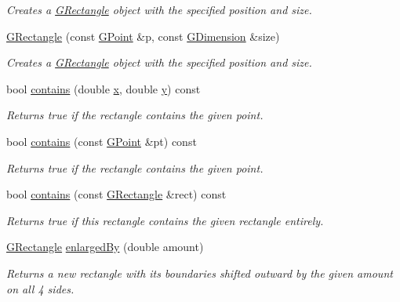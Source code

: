 \begin{DoxyCompactItemize}
\begin{DoxyCompactList}\small\item\em Creates a {\ttfamily \mbox{\hyperlink{structsgl_1_1GRectangle}{G\+Rectangle}}} object with the specified position and size. \end{DoxyCompactList}\item 
\mbox{\hyperlink{structsgl_1_1GRectangle_a90356cb96943b1a130aa934f150265a7}{G\+Rectangle}} (const \mbox{\hyperlink{structsgl_1_1GPoint}{G\+Point}} \&p, const \mbox{\hyperlink{structsgl_1_1GDimension}{G\+Dimension}} \&size)
\begin{DoxyCompactList}\small\item\em Creates a {\ttfamily \mbox{\hyperlink{structsgl_1_1GRectangle}{G\+Rectangle}}} object with the specified position and size. \end{DoxyCompactList}\item 
bool \mbox{\hyperlink{structsgl_1_1GRectangle_abb6a5d7c03e6eaaae97264c4799ce7c3}{contains}} (double \mbox{\hyperlink{structsgl_1_1GRectangle_af88b946fb90d5f08b5fb740c70e98c10}{x}}, double \mbox{\hyperlink{structsgl_1_1GRectangle_ab927965981178aa1fba979a37168db2a}{y}}) const
\begin{DoxyCompactList}\small\item\em Returns {\ttfamily true} if the rectangle contains the given point. \end{DoxyCompactList}\item 
bool \mbox{\hyperlink{structsgl_1_1GRectangle_a1dbc9dafaae51958112dbe1267a1f547}{contains}} (const \mbox{\hyperlink{structsgl_1_1GPoint}{G\+Point}} \&pt) const
\begin{DoxyCompactList}\small\item\em Returns {\ttfamily true} if the rectangle contains the given point. \end{DoxyCompactList}\item 
bool \mbox{\hyperlink{structsgl_1_1GRectangle_a5e2ef5fc6df7e73cd949c042ba2ffcf7}{contains}} (const \mbox{\hyperlink{structsgl_1_1GRectangle}{G\+Rectangle}} \&rect) const
\begin{DoxyCompactList}\small\item\em Returns {\ttfamily true} if this rectangle contains the given rectangle entirely. \end{DoxyCompactList}\item 
\mbox{\hyperlink{structsgl_1_1GRectangle}{G\+Rectangle}} \mbox{\hyperlink{structsgl_1_1GRectangle_adddb08ead701a5144949ca673a44292c}{enlarged\+By}} (double amount)
\begin{DoxyCompactList}\small\item\em Returns a new rectangle with its boundaries shifted outward by the given amount on all 4 sides. \end{DoxyCompactList}\item 

\end{DoxyCompactItemize}
